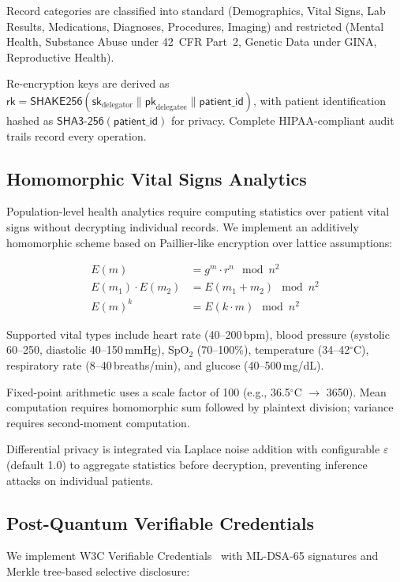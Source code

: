 \documentclass[conference,10pt]{IEEEtran}
\newcommand{\mldsa}{\textsf{ML-DSA}}
\newcommand{\shake}{\textsf{SHAKE256}}
\newcommand{\shaiii}{\textsf{SHA3-256}}
\begin{document}
Record categories are classified into standard (Demographics, Vital Signs, Lab Results, Medications, Diagnoses, Procedures, Imaging) and restricted (Mental Health, Substance Abuse under 42~CFR Part~2, Genetic Data under GINA, Reproductive Health).

Re-encryption keys are derived as $\mathsf{rk} = \shake{}(\mathsf{sk}_{\text{delegator}} \| \mathsf{pk}_{\text{delegatee}} \| \mathsf{patient\_id})$, with patient identification hashed as $\shaiii{}(\mathsf{patient\_id})$ for privacy. Complete HIPAA-compliant audit trails record every operation.

\subsection{Homomorphic Vital Signs Analytics}

Population-level health analytics require computing statistics over patient vital signs without decrypting individual records. We implement an additively homomorphic scheme based on Paillier-like encryption over lattice assumptions:

\begin{align}
    E(m) &= g^m \cdot r^n \mod n^2 \\
    E(m_1) \cdot E(m_2) &= E(m_1 + m_2) \mod n^2 \\
    E(m)^k &= E(k \cdot m) \mod n^2
\end{align}

Supported vital types include heart rate (40--200\,bpm), blood pressure (systolic 60--250, diastolic 40--150\,mmHg), SpO$_2$ (70--100\%), temperature (34--42$^\circ$C), respiratory rate (8--40\,breaths/min), and glucose (40--500\,mg/dL).

Fixed-point arithmetic uses a scale factor of 100 (e.g., 36.5$^\circ$C $\rightarrow$ 3650). Mean computation requires homomorphic sum followed by plaintext division; variance requires second-moment computation.

Differential privacy is integrated via Laplace noise addition with configurable $\varepsilon$ (default 1.0) to aggregate statistics before decryption, preventing inference attacks on individual patients.

\subsection{Post-Quantum Verifiable Credentials}

We implement W3C Verifiable Credentials~\cite{w3cvc} with \mldsa{}-65 signatures and Merkle tree-based selective disclosure:
\end{document}
